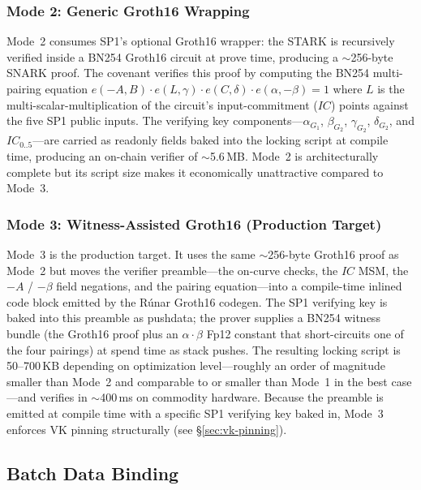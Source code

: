 \documentclass[11pt,twocolumn]{article}
\begin{document}
\subsubsection{Mode 2: Generic Groth16 Wrapping}
\label{sec:mode-groth16}

Mode~2 consumes SP1's optional Groth16 wrapper: the STARK is recursively verified inside a BN254 Groth16 circuit at prove time, producing a $\sim$256-byte SNARK proof. The covenant verifies this proof by computing the BN254 multi-pairing equation $e(-A, B) \cdot e(L, \gamma) \cdot e(C, \delta) \cdot e(\alpha, -\beta) = 1$ where $L$ is the multi-scalar-multiplication of the circuit's input-commitment ($IC$) points against the five SP1 public inputs. The verifying key components---$\alpha_{G_1}$, $\beta_{G_2}$, $\gamma_{G_2}$, $\delta_{G_2}$, and $IC_{0..5}$---are carried as readonly fields baked into the locking script at compile time, producing an on-chain verifier of $\sim$5.6\,MB. Mode~2 is architecturally complete but its script size makes it economically unattractive compared to Mode~3.

\subsubsection{Mode 3: Witness-Assisted Groth16 (Production Target)}
\label{sec:mode-groth16-wa}

Mode~3 is the production target. It uses the same $\sim$256-byte Groth16 proof as Mode~2 but moves the verifier preamble---the on-curve checks, the $IC$ MSM, the $-A$ / $-\beta$ field negations, and the pairing equation---into a compile-time inlined code block emitted by the R\'{u}nar Groth16 codegen. The SP1 verifying key is baked into this preamble as pushdata; the prover supplies a BN254 witness bundle (the Groth16 proof plus an $\alpha\cdot\beta$ Fp12 constant that short-circuits one of the four pairings) at spend time as stack pushes. The resulting locking script is 50--700\,KB depending on optimization level---roughly an order of magnitude smaller than Mode~2 and comparable to or smaller than Mode~1 in the best case---and verifies in $\sim$400\,ms on commodity hardware. Because the preamble is emitted at compile time with a specific SP1 verifying key baked in, Mode~3 enforces VK pinning structurally (see \S\ref{sec:vk-pinning}).

\subsection{Batch Data Binding}
\label{sec:da-binding}
\end{document}

